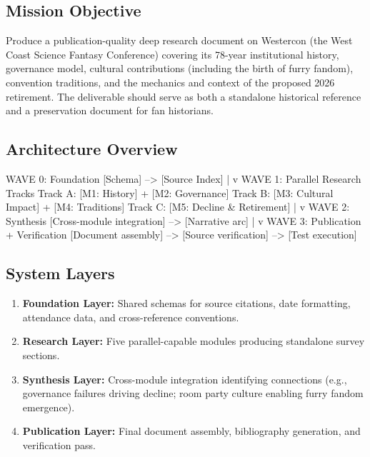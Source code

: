 \documentclass[11pt,letterpaper]{article}
\begin{document}
\subsection{Mission Objective}

Produce a publication-quality deep research document on Westercon (the West Coast Science Fantasy Conference) covering its 78-year institutional history, governance model, cultural contributions (including the birth of furry fandom), convention traditions, and the mechanics and context of the proposed 2026 retirement. The deliverable should serve as both a standalone historical reference and a preservation document for fan historians.

\subsection{Architecture Overview}

\begin{asciibox}
WAVE 0: Foundation
  [Schema] --> [Source Index]
       |
       v
WAVE 1: Parallel Research Tracks
  Track A: [M1: History] + [M2: Governance]
  Track B: [M3: Cultural Impact] + [M4: Traditions]
  Track C: [M5: Decline & Retirement]
       |
       v
WAVE 2: Synthesis
  [Cross-module integration] --> [Narrative arc]
       |
       v
WAVE 3: Publication + Verification
  [Document assembly] --> [Source verification]
       --> [Test execution]
\end{asciibox}

\subsection{System Layers}

\begin{enumerate}[leftmargin=2em]
  \item \textbf{Foundation Layer:} Shared schemas for source citations, date formatting, attendance data, and cross-reference conventions.
  \item \textbf{Research Layer:} Five parallel-capable modules producing standalone survey sections.
  \item \textbf{Synthesis Layer:} Cross-module integration identifying connections (e.g., governance failures driving decline; room party culture enabling furry fandom emergence).
  \item \textbf{Publication Layer:} Final document assembly, bibliography generation, and verification pass.
\end{enumerate}
\end{document}
